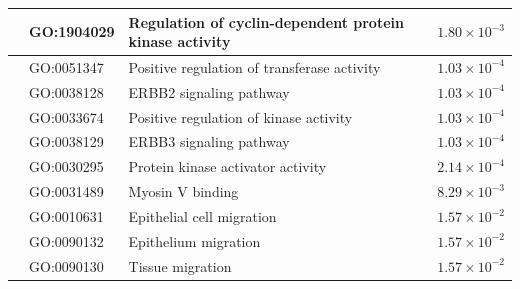 \begin{table}[htbp]
\begin{tabular}{p{2.2cm}p{2cm}p{9.5cm}p{2cm}}
 & GO:1904029 & Regulation of cyclin-dependent protein kinase activity & $1.80\times10^{-3}$ \\
\midrule
{} & GO:0051347 & Positive regulation of transferase activity & $1.03\times10^{-4}$ \\
 & GO:0038128 & ERBB2 signaling pathway & $1.03\times10^{-4}$ \\
 & GO:0033674 & Positive regulation of kinase activity & $1.03\times10^{-4}$ \\
 & GO:0038129 & ERBB3 signaling pathway & $1.03\times10^{-4}$ \\
 & GO:0030295 & Protein kinase activator activity & $2.14\times10^{-4}$ \\
\midrule
{} & GO:0031489 & Myosin V binding & $8.29\times10^{-3}$ \\
 & GO:0010631 & Epithelial cell migration & $1.57\times10^{-2}$ \\
 & GO:0090132 & Epithelium migration & $1.57\times10^{-2}$ \\
 & GO:0090130 & Tissue migration & $1.57\times10^{-2}$ \\
\bottomrule
\end{tabular}
\endgroup
\end{table}
